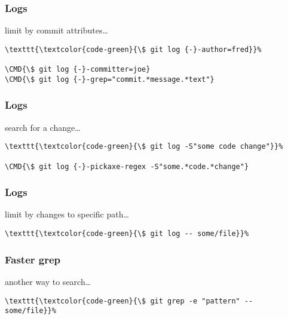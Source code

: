 \documentclass[english]{beamer}
\newcommand{\CMD}[1]{%
\texttt{\textcolor{code-green}{#1}}%
}
\begin{document}
\begin{frame}[fragile]
\frametitle{Logs}

limit by commit attributes\ldots
\vspace{\baselineskip}

\begin{Verbatim}[commandchars=\\\{\}]
\CMD{\$ git log {-}-author=fred}
\CMD{\$ git log {-}-committer=joe}
\CMD{\$ git log {-}-grep="commit.*message.*text"}
\end{Verbatim}

\vspace{\textheight}
\end{frame}

\begin{frame}[fragile]
\frametitle{Logs}

search for a change\ldots
\vspace{\baselineskip}

\begin{Verbatim}[commandchars=\\\{\}]
\CMD{\$ git log -S"some code change"}
\CMD{\$ git log {-}-pickaxe-regex -S"some.*code.*change"}
\end{Verbatim}

\vspace{\textheight}
\end{frame}

\begin{frame}[fragile]
\frametitle{Logs}

limit by changes to specific path\ldots
\vspace{\baselineskip}

\begin{Verbatim}[commandchars=\\\{\}]
\CMD{\$ git log -- some/file}
\end{Verbatim}

\vspace{\textheight}
\end{frame}

\begin{frame}[fragile]
\frametitle{Faster grep}

another way to search\ldots
\vspace{\baselineskip}

\begin{Verbatim}[commandchars=\\\{\}]
\CMD{\$ git grep -e "pattern" -- some/file}
\end{Verbatim}

\vspace{\textheight}
\end{frame}
\end{document}
